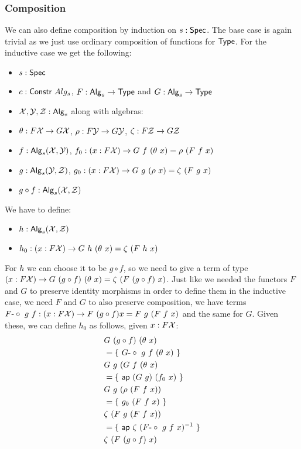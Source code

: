 \documentclass[a4paper,10pt]{article}
\begin{document}
\subsubsection{Composition}
We can also define composition by induction on $s : \mathsf{Spec}$. The base
case is again trivial as we just use ordinary composition of functions
for $\mathsf{Type}$. For the inductive case we get the following:
%
\begin{itemize}
\item $s : \mathsf{Spec}$ 
\item $c : \mathsf{Constr}\ Alg_s$, \ie $F : \mathsf{Alg}_s \to \mathsf{Type}$ and $G : \mathsf{Alg}_s \to \mathsf{Type}$
\item $\mathcal{X}, \mathcal{Y}, \mathcal{Z} : \mathsf{Alg}_s$ along with algebras:
\item $\theta : F \mathcal{X} \to G \mathcal{X}$, $\rho : F \mathcal{Y} \to G \mathcal{Y}$, $\zeta : F \mathcal{Z} \to G \mathcal{Z}$
\item $f : \mathsf{Alg}_s(\mathcal{X},\mathcal{Y})$, $f_0 : (x : F \mathcal{X}) \to G\ f\ (\theta\ x) = \rho\ (F\ f\ x)$
\item $g : \mathsf{Alg}_s(\mathcal{Y},\mathcal{Z})$, $g_0 : (x : F \mathcal{X}) \to G\ g\ (\rho\ x) = \zeta\ (F\ g\ x)$
\item $g \circ f : \mathsf{Alg}_s(\mathcal{X},\mathcal{Z})$
\end{itemize}
%
We have to define:
%
\begin{itemize}
  \item $h : \mathsf{Alg}_s(\mathcal{X},\mathcal{Z})$
  \item $h_0 : (x : F \alg{X}) \to G\ h\ (\theta\ x) = \zeta\ (F\ h\ x)$
\end{itemize}
%
For $h$ we can choose it to be $g \circ f$, so we need to give a term
of type
$(x : F \mathcal{X}) \to G\ (g \circ f)\ (\theta\ x) = \zeta\ (F\ (g \circ
f)\ x)$.
Just like we needed the functors $F$ and $G$ to preserve identity
morphisms in order to define them in the inductive case, we need $F$
and $G$ to also preserve composition, \ie we have terms
$F\mbox{-}\circ\ g\ f : (x : F \mathcal{X}) \to F\ (g \circ f) x = F\ g\ (F\ f\ x)$ and
the same for $G$. Given these, we can define $h_0$ as follows, given
$x : F \mathcal{X}$:
%
\begin{align*}
  &G\ (g \circ f)\ (\theta\ x) \\
  &= \{\ G\mbox{-}\circ\ g\ f\ (\theta\ x)\ \} \\
  &G\ g\ (G\ f\ (\theta\ x) \\
  &= \{\ \mathsf{ap}\ (G\ g)\ (f_0\ x)\ \} \\
  &G\ g\ (\rho\ (F\ f\ x)) \\
  &= \{\ g_0\ (F\ f\ x)\ \} \\
  &\zeta\ (F\ g\ (F\ f\ x)) \\
  &= \{\ \mathsf{ap}\ \zeta\ (F\mbox{-}\circ\ g\ f\ x)^{-1}\ \} \\
  &\zeta\ (F\ (g \circ f)\ x)
\end{align*}
\end{document}
